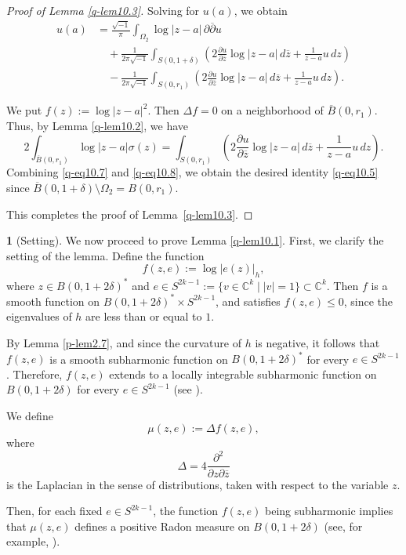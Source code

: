 \documentclass[12pt,twoside]{amsart}
\theoremstyle{definition}
\newtheorem{say}[thm]{}
\begin{document}
\begin{proof}[Proof of Lemma \ref{q-lem10.3}]
Solving for \( u(a) \), we obtain
\begin{equation}\label{q-eq10.7}
\begin{split}
u(a) &= \frac{\sqrt{-1}}{\pi} \int_{\Omega_2} \log |z-a|\, \partial \overline{\partial} u \\
&\quad + \frac{1}{2\pi \sqrt{-1}} \int_{S(0,1+\delta)}
\left( 2 \frac{\partial u}{\partial \overline{z}} \log|z-a|\, d\overline{z}
+ \frac{1}{z-a} u\, dz \right) \\
&\quad - \frac{1}{2\pi \sqrt{-1}} \int_{S(0,r_1)}
\left( 2 \frac{\partial u}{\partial \overline{z}} \log|z-a|\, d\overline{z}
+ \frac{1}{z-a} u\, dz \right).
\end{split}
\end{equation}

We put $f(z):=\log |z-a|^2$. Then $\Delta f=0$ on a neighborhood 
of $\overline B(0, r_1)$. 
Thus, by Lemma \ref{q-lem10.2}, we have
\begin{equation}\label{q-eq10.8}
2 \int_{\overline{B}(0, r_1)} \log |z-a|\sigma (z)
= \int_{S(0, r_1)} \left(
2 \frac{\partial u}{\partial \overline{z}} \log|z-a|\, d\overline{z}
+ \frac{1}{z-a} u\, dz \right).
\end{equation}
Combining \eqref{q-eq10.7} and \eqref{q-eq10.8}, we obtain 
the desired identity \eqref{q-eq10.5} 
since $\overline B(0, 1+\delta)\setminus \Omega_2=B(0, r_1)$.

This completes the proof of Lemma~\ref{q-lem10.3}.
\end{proof}

\begin{say}[Setting]\label{q-say10.4} 
We now proceed to prove Lemma \ref{q-lem10.1}.  
First, we clarify the setting of the lemma.  
Define the function  
\[
f(z, e) := \log |e(z)|_h,
\]  
where \( z \in B(0,1+2\delta)^* \) 
and \( e \in S^{2k-1} := \{v \in \mathbb{C}^k \mid |v| = 1\} \subset \mathbb{C}^k \). 
Then $f$ is a smooth function on 
$B(0, 1+2\delta)^* \times S^{2k-1}$, and satisfies 
$f(z, e) \leq 0$, since the eigenvalues 
of $h$ are less than or equal to $1$.

By Lemma \ref{p-lem2.7}, and since the curvature 
of $h$ is negative, it follows that 
$f(z, e)$ is a smooth subharmonic function on $B(0, 1+2\delta)^*$ 
for every $e \in S^{2k-1}$.
Therefore, $f(z, e)$ extends to a locally integrable subharmonic 
function on $B(0,1+2\delta)$ for every $e \in S^{2k-1}$ 
(see \cite[(3.3.25) Theorem]{noguchi-ochiai}).

We define
\[
\mu(z, e) := \Delta f(z, e),
\]
where
\[
\Delta = 4\frac{\partial^2}{\partial z \partial \overline{z}}
\]
is the Laplacian in the sense of distributions, taken 
with respect to the variable $z$.

Then, for each fixed $e \in S^{2k-1}$, the function $f(z, e)$ being 
subharmonic implies that $\mu(z, e)$ defines a positive Radon 
measure on $B(0,1+2\delta)$ (see, for example, \cite[(3.1.14) Lemma]{noguchi-ochiai}).
\end{say}
\end{document}

